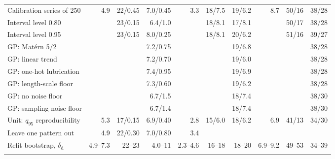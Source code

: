 \documentclass[pdflatex,sn-basic]{sn-jnl}
\begin{document}
\begin{table}[tbp]
\begin{tabular}{@{}lrrrrrrrrr@{}}
Calibration series of 250 & 4.9 & 22/0.45 & 7.0/0.45 & 3.3 & 18/7.5 & 19/6.2 & 8.7 & 50/16 & 38/28 \\
Interval level 0.80 &  & 23/0.15 & 6.4/1.0 &  & 18/8.1 & 17/8.1 &  & 50/17 & 38/28 \\
Interval level 0.95 &  & 23/0.15 & 8.0/0.25 &  & 18/8.1 & 20/6.2 &  & 51/16 & 39/27 \\
GP: Mat\'ern 5/2 &  &  & 7.2/0.75 &  &  & 19/6.8 &  &  & 38/28 \\
GP: linear trend &  &  & 7.2/0.70 &  &  & 19/6.0 &  &  & 38/28 \\
GP: one-hot lubrication &  &  & 7.4/0.95 &  &  & 19/6.9 &  &  & 38/28 \\
GP: length-scale floor &  &  & 7.3/0.60 &  &  & 19/6.2 &  &  & 38/28 \\
GP: no noise floor &  &  & 6.7/1.5 &  &  & 18/7.4 &  &  & 38/30 \\
GP: sampling noise floor &  &  & 6.7/1.4 &  &  & 18/7.4 &  &  & 38/30 \\
Unit: $q_{95}$ reproducibility & 5.3 & 17/0.15 & 6.9/0.40 & 2.8 & 15/6.0 & 18/6.2 & 6.9 & 41/13 & 34/30 \\
Leave one pattern out & 4.9 & 22/0.30 & 7.0/0.80 & 3.4 & & & & & \\
\midrule Refit bootstrap, $\delta_\mathrm{d}$ & 4.9--7.3 & 22--23 & 4.0--11 & 2.3--4.6 & 16--18 & 18--20 & 6.9--9.2 & 49--53 & 34--39 \\
\botrule
\end{tabular}
\end{table}
\end{document}
